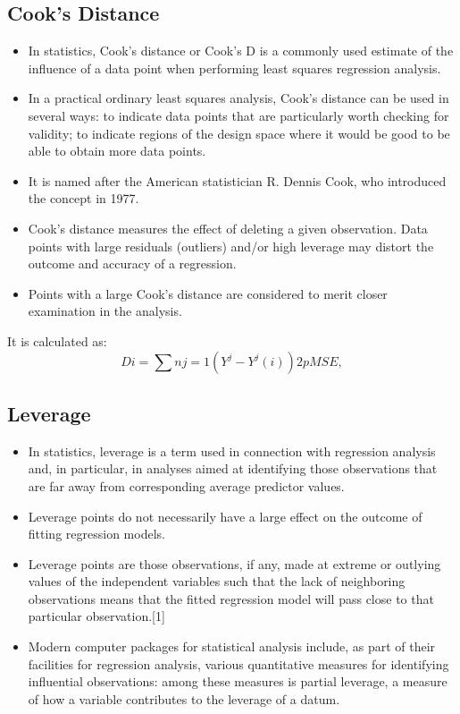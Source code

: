 \documentclass[residuals.tex]{subfiles}
\begin{document}
\subsection*{Cook's Distance}	
\begin{itemize}
\item In statistics, Cook's distance or Cook's D is a commonly used estimate of the influence of a data point when performing least squares regression analysis.

\item In a practical ordinary least squares analysis, Cook's distance can be used in several ways: to indicate data points that are particularly worth checking for validity; to indicate regions of the design space where it would be good to be able to obtain more data points. 
\item 
It is named after the American statistician R. Dennis Cook, who introduced the concept in 1977.
 
\item 
Cook's distance measures the effect of deleting a given observation. Data points with large residuals (outliers) and/or high leverage may distort the outcome and accuracy of a regression. 

\item Points with a large Cook's distance are considered to merit closer examination in the analysis. 

\end{itemize}
It is calculated as:
\[
 D i =∑ n j=1 (Y ^  j  −Y ^  j(i) ) 2  p MSE  , 
\]
\newpage
\subsection{Leverage}
\begin{itemize}
\item In statistics, leverage is a term used in connection with regression analysis and, in particular, in analyses aimed at identifying those observations that are far away from corresponding average predictor values.

\item  Leverage points do not necessarily have a large effect on the outcome of fitting regression models.

\item Leverage points are those observations, if any, made at extreme or outlying values of the independent variables such that the lack of neighboring observations means that the fitted regression model will pass close to that particular observation.[1]

\item Modern computer packages for statistical analysis include, as part of their facilities for regression analysis, various quantitative measures for identifying influential observations: among these measures is partial leverage, a measure of how a variable contributes to the leverage of a datum.

\end{itemize}
\end{document}
